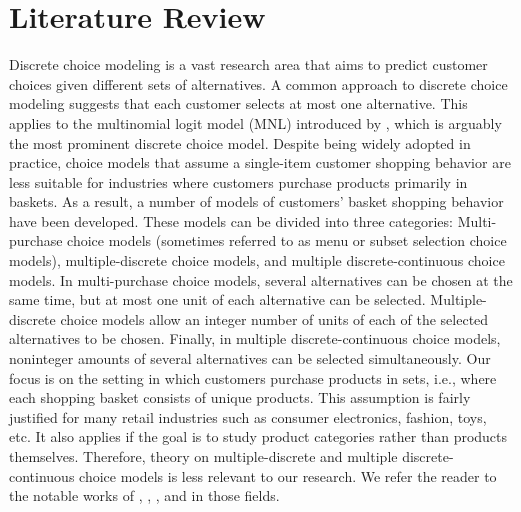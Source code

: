\section{Literature Review}
\label{2sec:lit}

Discrete choice modeling is a vast research area that aims to predict customer choices given different sets of alternatives. A common approach to discrete choice modeling suggests that each customer selects at most one alternative. This applies to the multinomial logit model (MNL) introduced by \cite{Luce1959}, which is arguably the most prominent discrete choice model. Despite being widely adopted in practice, choice models that assume a single-item customer shopping behavior are less suitable for industries where customers purchase products primarily in baskets. As a result, a number of models of customers' basket shopping behavior have been developed.
These models can be divided into three categories: Multi-purchase choice models (sometimes referred to as menu or subset selection choice models), multiple-discrete choice models, and multiple discrete-continuous choice models. In multi-purchase choice models, several alternatives can be chosen at the same time, but at most one unit of each alternative can be selected.
Multiple-discrete choice models allow an integer number of units of each of the selected alternatives to be chosen. Finally, in multiple discrete-continuous choice models, noninteger amounts of several alternatives can be selected simultaneously. 
Our focus is on the setting in which customers purchase products in sets, i.e., where each shopping basket consists of unique products. This assumption is fairly justified for many retail industries such as consumer electronics, fashion, toys, etc. It also applies if the goal is to study product categories rather than products themselves. Therefore, theory on multiple-discrete and multiple discrete-continuous choice models is less relevant to our research. We refer the reader to the notable works of \cite{Hendel1}, \cite{Dube1}, \cite{Kim1}, \cite{bhat1} and \cite{bhat2} in those fields.



